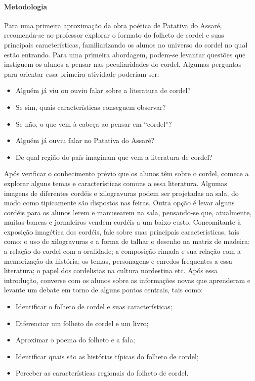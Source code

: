 \documentclass[11pt]{extarticle}
\begin{document}
\paragraph{Metodologia} Para uma primeira aproximação da obra poética de Patativa do Assaré, recomenda-se ao professor explorar o formato do folheto de cordel e suas principais características, familiarizando os alunos no universo do cordel no qual estão entrando. 
Para uma primeira abordagem, podem-se levantar questões que instiguem os alunos a pensar nas peculiaridades do cordel.
Algumas perguntas para orientar essa primeira atividade poderiam ser:

\begin{itemize}
\item Alguém já viu ou ouviu falar sobre a literatura de cordel?

\item Se sim, quais características conseguem observar?

\item Se não, o que vem à cabeça ao pensar em ``cordel''?

\item Alguém já ouviu falar no Patativa do Assaré?

\item De qual região do país imaginam que vem a literatura de cordel?
\end{itemize}


Após verificar o conhecimento prévio que os alunos têm sobre o cordel, comece a explorar alguns temas e características comuns a essa literatura. Algumas imagens de diferentes cordéis e xilogravuras podem ser projetadas na sala, do modo como tipicamente são dispostos nas feiras. Outra opção é levar alguns cordéis para os alunos lerem e manusearem na sala, pensando-se que, atualmente, muitas bancas e jornaleiros vendem cordéis a um baixo custo.
Concomitante à exposição imagética dos cordéis, fale sobre suas principais características, tais como: o uso de xilogravuras e a forma de talhar o desenho na matriz de madeira; a relação do cordel com a oralidade; a composição rimada e sua relação com a memorização da história; os temas, personagens e enredos frequentes a essa literatura; o papel dos cordelistas na cultura nordestina etc.
Após essa introdução, converse com os alunos sobre as informações novas que aprenderam e levante um debate em torno de alguns pontos centrais, tais como:

\begin{itemize}
\item Identificar o folheto de cordel e suas características;

\item Diferenciar um folheto de cordel e um livro;

\item Aproximar o poema do folheto e a fala;

\item Identificar quais são as histórias típicas do folheto de cordel;

\item Perceber as características regionais do folheto de cordel.
\end{itemize}
\end{document}
